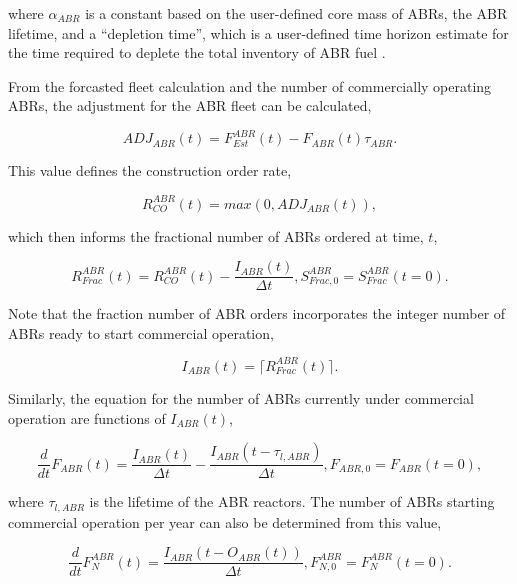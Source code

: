 where $\alpha_{ABR}$ is a constant based on the user-defined core mass of ABRs,
the ABR lifetime, and a ``depletion time'', which is a user-defined time horizon
estimate for the time required to deplete the total inventory of ABR
fuel \cite{busquim_e_silva_system_2008}.

From the forcasted fleet calculation and the number of commercially operating
ABRs, the adjustment for the ABR fleet can be calculated,

\begin{equation}
 ADJ_{ABR}(t) = {F_{Est}^{ABR}(t) - F_{ABR}(t)}{\tau_{ABR}}.
\end{equation}

This value defines the construction order rate,

\begin{equation}
 R_{CO}^{ABR}(t) = max \left( 0, ADJ_{ABR}(t) \right),
\end{equation}

which then informs the fractional number of ABRs ordered at time, $t$, 

\begin{equation}
 R^{ABR}_{Frac}(t) = R_{CO}^{ABR}(t) - \frac{I_{ABR}(t)}{\Delta t}, S^{ABR}_{Frac,0} = S^{ABR}_{Frac}(t=0).
\end{equation}

Note that the fraction number of ABR orders incorporates the integer number of
ABRs ready to start commercial operation,

\begin{equation}
 I_{ABR}(t) = \lceil R^{ABR}_{Frac}(t) \rceil.
\end{equation}

Similarly, the equation for the number of ABRs currently under commercial
operation are functions of $I_{ABR}(t)$,

\begin{equation}
 \frac{d}{dt} F_{ABR}(t) = \frac{I_{ABR}(t)}{\Delta t} - \frac{I_{ABR}(t-\tau_{l,ABR})}{\Delta t}, F_{ABR,0} = F_{ABR}(t=0),
\end{equation}

where $\tau_{l,ABR}$ is the lifetime of the ABR reactors. The number of ABRs
starting commercial operation per year can also be determined from this value,

\begin{equation}
 \frac{d}{dt} F_N^{ABR}(t) = \frac{I_{ABR}(t - O_{ABR}(t))}{\Delta t}, F^{ABR}_{N,0} = F^{ABR}_{N}(t=0).
\end{equation}

